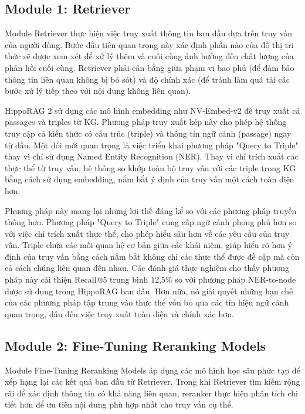 \documentclass[../main.tex]{subfiles}
\begin{document}
\subsection{Module 1: Retriever}
Module Retriever thực hiện việc truy xuất thông tin ban đầu dựa trên truy vấn của người dùng. Bước đầu tiên quan trọng này xác định phần nào của đồ thị tri thức sẽ được xem xét để xử lý thêm và cuối cùng ảnh hưởng đến chất lượng của phản hồi cuối cùng. Retriever phải cân bằng giữa phạm vi bao phủ (để đảm bảo thông tin liên quan không bị bỏ sót) và độ chính xác (để tránh làm quá tải các bước xử lý tiếp theo với nội dung không liên quan).

HippoRAG 2 sử dụng các mô hình embedding như NV-Embed-v2 để truy xuất cả passages và triples từ KG. Phương pháp truy xuất kép này cho phép hệ thống truy cập cả kiến thức có cấu trúc (triple) và thông tin ngữ cảnh (passage) ngay từ đầu. Một đổi mới quan trọng là việc triển khai phương pháp "Query to Triple" thay vì chỉ sử dụng Named Entity Recognition (NER). Thay vì chỉ trích xuất các thực thể từ truy vấn, hệ thống so khớp toàn bộ truy vấn với các triple trong KG bằng cách sử dụng embedding, nắm bắt ý định của truy vấn một cách toàn diện hơn.

Phương pháp này mang lại những lợi thế đáng kể so với các phương pháp truyền thống hơn. Phương pháp "Query to Triple" cung cấp ngữ cảnh phong phú hơn so với việc chỉ trích xuất thực thể, cho phép hiểu sâu hơn về các yêu cầu của truy vấn. Triple chứa các mối quan hệ cơ bản giữa các khái niệm, giúp hiểu rõ hơn ý định của truy vấn bằng cách nắm bắt không chỉ các thực thể được đề cập mà còn cả cách chúng liên quan đến nhau. Các đánh giá thực nghiệm cho thấy phương pháp này cải thiện Recall@5 trung bình 12,5\% so với phương pháp NER-to-node được sử dụng trong HippoRAG ban đầu. Hơn nữa, nó giải quyết những hạn chế của các phương pháp tập trung vào thực thể vốn bỏ qua các tín hiệu ngữ cảnh quan trọng, dẫn đến việc truy xuất toàn diện và chính xác hơn.

\subsection{Module 2: Fine-Tuning Reranking Models}
Module Fine-Tuning Reranking Models áp dụng các mô hình học sâu phức tạp để xếp hạng lại các kết quả ban đầu từ Retriever. Trong khi Retriever tìm kiếm rộng rãi để xác định thông tin có khả năng liên quan, reranker thực hiện phân tích chi tiết hơn để ưu tiên nội dung phù hợp nhất cho truy vấn cụ thể.
\end{document}
